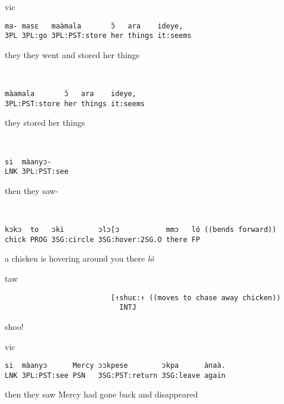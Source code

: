 \documentclass[output=paper]{langsci/langscibook}
\begin{document}
\vspace{2mm}
%
\begin{transbox}{1}{vic}
\begin{verbatim}
ma- masɛ   maàmala       ɔ̃   ara    ideye,
3PL 3PL:go 3PL:PST:store her things it:seems
\end{verbatim}
they they went and stored her things
\end{transbox}
%
\begin{transbox}{2}{~}
\begin{verbatim}
màamala       ɔ̃   ara    ideye,
3PL:PST:store her things it:seems
\end{verbatim}
they stored her things
\end{transbox}
%
\begin{transbox}{3}{~}
\begin{verbatim}
si  màanyɔ-
LNK 3PL:PST:see
\end{verbatim}
then they saw-
\end{transbox}
%
\begin{mdframednoverticalspace}[style=firstfoc]
\begin{transbox}{4}{~}
\begin{verbatim}
kɔkɔ  to   ɔki        ɔlɔ[ɔ           mmɔ   ló ((bends forward))
chick PROG 3SG:circle 3SG:hover:2SG.O there FP
\end{verbatim}
a chicken is hovering around you there \textit{ló}
\end{transbox}
\end{mdframednoverticalspace}
%
\begin{mdframednoverticalspace}[style=secondfoc]
\begin{transbox}{5}{taw}
\begin{verbatim}
                         [↑shuɛ:↑ ((moves to chase away chicken))
                           INTJ
\end{verbatim}
\hspace{3.95cm} shoo!
\end{transbox}
\end{mdframednoverticalspace}
%
\vspace{-2mm}
%
\begin{transbox}{7}{vic}
\begin{verbatim}
si  màanyɔ      Mercy ɔɔkpese        ɔkpa      ànaà.
LNK 3PL:PST:see PSN   3SG:PST:return 3SG:leave again
\end{verbatim}
then they saw Mercy had gone back and disappeared
\end{transbox}\bigskip
\end{document}
